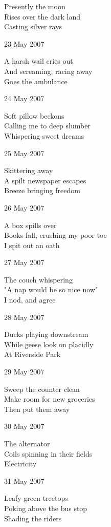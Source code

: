 \documentclass[12pt]{article}
\begin{document}
Presently the moon \\
Rises over the dark land \\
Casting silver rays

23 May 2007

A harsh wail cries out \\
And screaming, racing away \\
Goes the ambulance

24 May 2007 

Soft pillow beckons \\
Calling me to deep slumber \\
Whispering sweet dreams

25 May 2007

Skittering away \\
A spilt newspaper escapes \\
Breeze bringing freedom


\newpage

26 May 2007

A box spills over \\
Books fall, crushing my poor toe \\
I spit out an oath

27 May 2007

The couch whispering \\
"A nap would be so nice now" \\
I nod, and agree

28 May 2007

Ducks playing downstream \\
While geese look on placidly \\
At Riverside Park

29 May 2007

Sweep the counter clean \\
Make room for new groceries \\
Then put them away

30 May 2007

The alternator \\
Coils spinning in their fields \\
Electricity

31 May 2007

Leafy green treetops \\
Poking above the bus stop  \\
Shading the riders


\newpage
\end{document}

